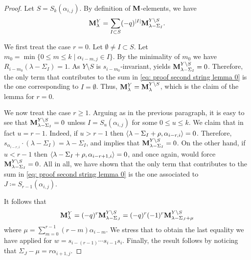 \begin{proof}
Let $S= S_{k}(\alpha_{i,j})$.
By definition of $\mathbf{M}$-elements, we have
\begin{equation}\label{eq: proof second string lemma 0}
\mathbf{M}_{\lambda}^{Y} = \sum\limits_{I \subset S} (-q)^{|I|} \mathbf{M}_{\lambda - \Sigma_I}^{Y \setminus  S}.
\end{equation}

We first treat the case $r=0$. 
Let $\emptyset \neq I \subset S$. 
Let $m_0 =\min \{ 0\leq m \leq k \mid \alpha_{i-m,j}\in I  \}$.
By the minimality of $m_0$ we have $R_{i-m_0}(\lambda - \Sigma_I)=1$. 
As $Y\setminus S$ is $s_{i-m_0}$-invariant,  yields  $\mathbf{M}_{\lambda - \Sigma_I}^{Y \setminus S}=0$.
Therefore, the only term that contributes to the sum in   \eqref{eq: proof second string lemma 0}  is the one corresponding to  $I=\emptyset$. 
Thus,  $\mathbf{M}_{\lambda}^{Y} = \mathbf{M}_{\lambda }^{Y\setminus S}$, which is the claim of the lemma for $r=0$. 


We now treat the case $r \geq 1$. 
Arguing as in the previous paragraph, it is easy to see that $\mathbf{M}_{\lambda - \Sigma_I}^{Y \setminus S}=0$ unless $I=S_u(\alpha_{i,j})$ for some $0 \leq u \leq k$. 
We claim that in fact $u = r-1$.
Indeed, if $u>r-1$ then $\langle \lambda-\Sigma_I+\rho , \alpha_{i-r,i} \rangle=0$. 
Therefore, $s_{\alpha_{i-r,i}}\cdot ( \lambda-\Sigma_I )= \lambda-\Sigma_I $, and  implies that $\mathbf{M}_{\lambda - \Sigma_I}^{Y \setminus S} = 0$.
On the other hand, if $u<r-1$ then $\langle \lambda-\Sigma_I+\rho , \alpha_{i-r+1,i} \rangle=0$, and once again,  would force $\mathbf{M}_{\lambda - \Sigma_I}^{Y \setminus S} = 0$.
All in all, we have shown that the only term that contributes to the sum in \eqref{eq: proof second string lemma 0} is the one associated to $J\coloneqq S_{r-1}(\alpha_{i,j})$.

It follows that
\begin{equation}
    \mathbf{M}_{\lambda}^{Y} = (-q)^r\mathbf{M}_{\lambda - \Sigma_{J}}^{Y \setminus S} = (-q)^r(-1)^{r} \mathbf{M}_{\lambda - \Sigma_{J} +\mu}^{Y \setminus S}
\end{equation}
where $\displaystyle \mu = \sum_{m=0}^{r-1} (r-m) \alpha_{i-m}$. 
We stress that to obtain the last equality we have applied  for $w=s_{i-(r-1)} \cdots   s_{i-1}s_i$.
Finally, the result follows by noticing that $   \Sigma_{J} - \mu  =  r\alpha_{i+1,j}$. 
\end{proof}





